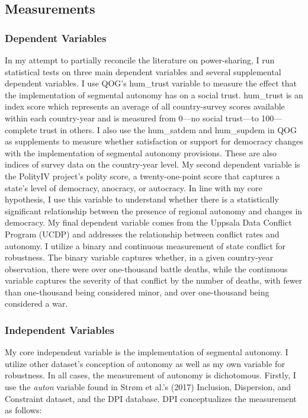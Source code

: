 \documentclass[12pt]{article}
\begin{document}
\subsection{Measurements}
\subsubsection{Dependent Variables} 
In my attempt to partially reconcile the literature on power-sharing, I run statistical tests on three main dependent variables and several supplemental dependent variables. I use QOG’s hum\_trust variable to measure the effect that the implementation of segmental autonomy has on a social trust. hum\_trust is an index score which represents an average of all country-survey scores available within each country-year and is measured from 0—no social trust—to 100—complete trust in others. I also use the hum\_satdem and hum\_supdem in QOG as supplements to measure whether satisfaction or support for democracy changes with the implementation of segmental autonomy provisions. These are also indices of survey data on the country-year level. My second dependent variable is the PolityIV project’s polity score, a twenty-one-point score that captures a state’s level of democracy, anocracy, or autocracy. In line with my core hypothesis, I use this variable to understand whether there is a statistically significant relationship between the presence of regional autonomy and changes in democracy. My final dependent variable comes from the Uppsala Data Conflict Program (UCDP) and addresses the relationship between conflict rates and autonomy. I utilize a binary and continuous measurement of state conflict for robustness. The binary variable captures whether, in a given country-year observation, there were over one-thousand battle deaths, while the continuous variable captures the severity of that conflict by the number of deaths, with fewer than one-thousand being considered minor, and over one-thousand being considered a war. 

\subsubsection{Independent Variables} 
My core independent variable is the implementation of segmental autonomy. I utilize other dataset’s conception of autonomy as well as my own variable for robustness. In all cases, the measurement of autonomy is dichotomous. Firstly, I use the \textit{auton} variable found in Strøm et al.’s (2017) Inclusion, Dispersion, and Constraint dataset, and the DPI database. DPI conceptualizes the measurement as follows:
\end{document}
